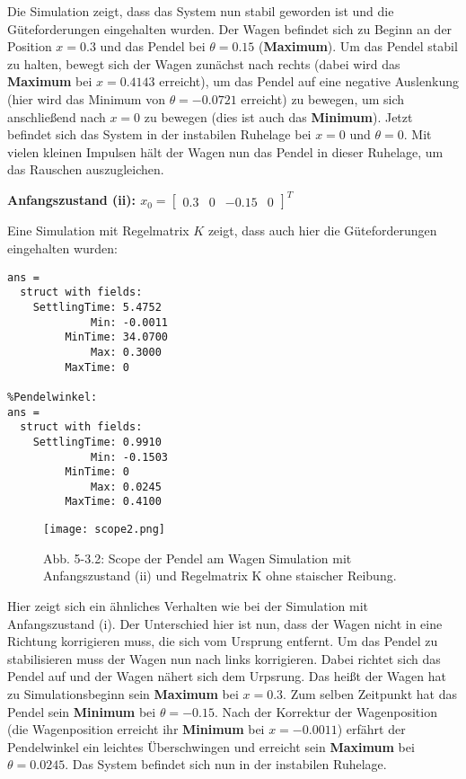 \documentclass[11pt]{scrartcl} %
\begin{document}
Die Simulation zeigt, dass das System nun stabil geworden ist und die Güteforderungen eingehalten wurden. Der Wagen befindet sich zu Beginn an der Position $x=0.3$ und das Pendel bei $\theta=0.15$ (\textbf{Maximum}). Um das Pendel stabil zu halten, bewegt sich der Wagen zunächst nach rechts (dabei wird das \textbf{Maximum} bei $x=0.4143$ erreicht), um das Pendel auf eine negative Auslenkung (hier wird das Minimum von $\theta=-0.0721$ erreicht) zu bewegen, um sich anschließend nach $x=0$ zu bewegen (dies ist auch das \textbf{Minimum}). Jetzt befindet sich das System in der instabilen Ruhelage bei $x=0$ und $\theta=0$. Mit vielen kleinen Impulsen hält der Wagen nun das Pendel in dieser Ruhelage, um das Rauschen auszugleichen.

\pagebreak
\textbf{Anfangszustand (ii): $x_0 = \begin{bmatrix}
0.3 & 0 & -0.15 & 0
\end{bmatrix}^T$}

Eine Simulation mit Regelmatrix $K$ zeigt, dass auch hier die Güteforderungen eingehalten wurden:
\begin{Verbatim}[frame=single]
%Wagenposition:
ans = 
  struct with fields:
    SettlingTime: 5.4752
             Min: -0.0011
         MinTime: 34.0700
             Max: 0.3000
         MaxTime: 0

%Pendelwinkel:
ans = 
  struct with fields:
    SettlingTime: 0.9910
             Min: -0.1503
         MinTime: 0
             Max: 0.0245
         MaxTime: 0.4100
\end{Verbatim}
\begin{figure}[H]
	\centering
	\texttt{[image: scope2.png]}
	\captionsetup{labelformat=empty}
	\caption{\small{Abb. 5-3.2: Scope der Pendel am Wagen Simulation mit Anfangszustand (ii) und Regelmatrix K ohne staischer Reibung.}}
\end{figure}

Hier zeigt sich ein ähnliches Verhalten wie bei der Simulation mit Anfangszustand (i). Der Unterschied hier ist nun, dass der Wagen nicht in eine Richtung korrigieren muss, die sich vom Ursprung entfernt. Um das Pendel zu stabilisieren muss der Wagen nun nach links korrigieren. Dabei richtet sich das Pendel auf und der Wagen nähert sich dem Urpsrung. Das heißt der Wagen hat zu Simulationsbeginn sein \textbf{Maximum} bei $x=0.3$. Zum selben Zeitpunkt hat das Pendel sein \textbf{Minimum} bei $\theta=-0.15$. Nach der Korrektur der Wagenposition (die Wagenposition erreicht ihr \textbf{Minimum} bei $x=-0.0011$) erfährt der Pendelwinkel ein leichtes Überschwingen und erreicht sein \textbf{Maximum} bei $\theta=0.0245$. Das System befindet sich nun in der instabilen Ruhelage.
\end{document}

